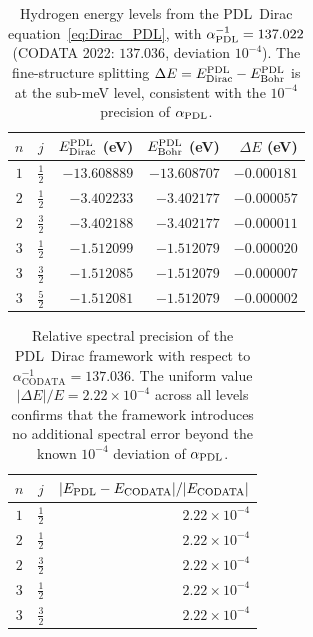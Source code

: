 \documentclass[11pt,a4paper]{article}
\theoremstyle{definition}
\newcommand{\PDL}{\textnormal{PDL}}
\newcommand{\aPDL}{\alpha_{\PDL}}
\begin{document}
\begin{table}[ht]
\centering
\caption{Hydrogen energy levels from the \PDL\ Dirac equation~\eqref{eq:Dirac_PDL}, with $\aPDL^{-1} = 137.022$ (CODATA 2022: $137.036$, deviation $10^{-4}$). The fine-structure splitting $\Delta E = E_{\mathrm{Dirac}}^{\PDL} - E_{\mathrm{Bohr}}^{\PDL}$ is at the sub-meV level, consistent with the $10^{-4}$ precision of $\aPDL$.}
\label{tab:spectrum}
\begin{tabular}{ccrrr}
\toprule
$n$ & $j$ & $E_{\mathrm{Dirac}}^{\PDL}$ (eV) & $E_{\mathrm{Bohr}}^{\PDL}$ (eV) & $\Delta E$ (eV) \\
\midrule
$1$ & $\tfrac{1}{2}$ & $-13.608889$ & $-13.608707$ & $-0.000181$ \\
$2$ & $\tfrac{1}{2}$ & $-3.402233$  & $-3.402177$  & $-0.000057$ \\
$2$ & $\tfrac{3}{2}$ & $-3.402188$  & $-3.402177$  & $-0.000011$ \\
$3$ & $\tfrac{1}{2}$ & $-1.512099$  & $-1.512079$  & $-0.000020$ \\
$3$ & $\tfrac{3}{2}$ & $-1.512085$  & $-1.512079$  & $-0.000007$ \\
$3$ & $\tfrac{5}{2}$ & $-1.512081$  & $-1.512079$  & $-0.000002$ \\
\bottomrule
\end{tabular}
\end{table}

\begin{table}[ht]
\centering
\caption{Relative spectral precision of the \PDL\ Dirac framework with respect to $\alpha_{\mathrm{CODATA}}^{-1} = 137.036$. The uniform value $|\Delta E|/E = 2.22\times10^{-4}$ across all levels confirms that the framework introduces no additional spectral error beyond the known $10^{-4}$ deviation of $\aPDL$.}
\label{tab:precision}
\begin{tabular}{ccr}
\toprule
$n$ & $j$ & $|E_{\PDL} - E_{\mathrm{CODATA}}|/|E_{\mathrm{CODATA}}|$ \\
\midrule
$1$ & $\tfrac{1}{2}$ & $2.22\times10^{-4}$ \\
$2$ & $\tfrac{1}{2}$ & $2.22\times10^{-4}$ \\
$2$ & $\tfrac{3}{2}$ & $2.22\times10^{-4}$ \\
$3$ & $\tfrac{1}{2}$ & $2.22\times10^{-4}$ \\
$3$ & $\tfrac{3}{2}$ & $2.22\times10^{-4}$ \\
\bottomrule
\end{tabular}
\end{table}
\end{document}

